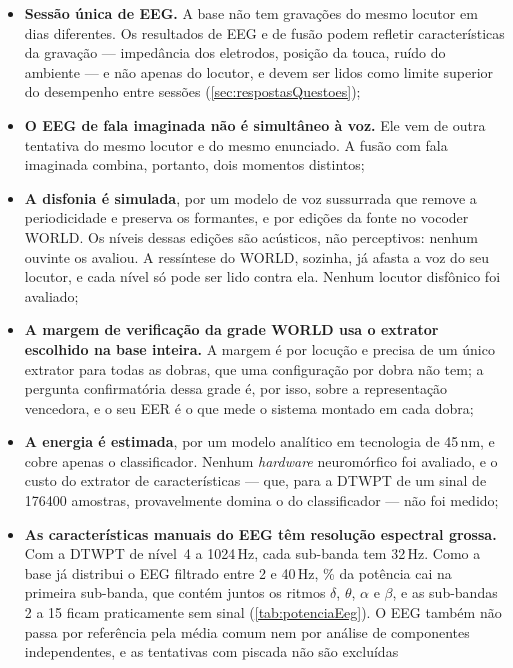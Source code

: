 		\begin{itemize}
			\item \textbf{Sessão única de \ac{EEG}.} A base não tem gravações do
			mesmo locutor em dias diferentes. Os resultados de \ac{EEG} e de fusão
			podem refletir características da gravação --- impedância dos
			eletrodos, posição da touca, ruído do ambiente --- e não apenas do
			locutor, e devem ser lidos como limite superior do desempenho entre
			sessões (\autoref{sec:respostasQuestoes});
			\item \textbf{O \ac{EEG} de fala imaginada não é simultâneo à voz.} Ele
			vem de outra tentativa do mesmo locutor e do mesmo enunciado. A fusão
			com fala imaginada combina, portanto, dois momentos distintos;
			\item \textbf{A disfonia é simulada}, por um modelo de voz sussurrada
			que remove a periodicidade e preserva os formantes, e por edições da
			fonte no vocoder WORLD. Os níveis dessas edições são acústicos, não
			perceptivos: nenhum ouvinte os avaliou. A ressíntese do WORLD, sozinha,
			já afasta a voz do seu locutor, e cada nível só pode ser lido contra
			ela. Nenhum locutor disfônico foi avaliado;
			\item \textbf{A margem de verificação da grade WORLD usa o extrator
			escolhido na base inteira.} A margem é por locução e precisa de um
			único extrator para todas as dobras, que uma configuração por dobra não
			tem; a pergunta confirmatória dessa grade é, por isso, sobre a
			representação vencedora, e o seu \ac{EER} é o que mede o sistema
			montado em cada dobra;
			\item \textbf{A energia é estimada}, por um modelo analítico em
			tecnologia de 45\,nm, e cobre apenas o classificador. Nenhum
			\textit{hardware} neuromórfico foi avaliado, e o custo do extrator de
			características --- que, para a \ac{DTWPT} de um sinal de 176400
			amostras, provavelmente domina o do classificador --- não foi medido;
			\item \textbf{As características manuais do \ac{EEG} têm resolução
			espectral grossa.} Com a \ac{DTWPT} de nível~4 a 1024\,Hz, cada
			sub-banda tem 32\,Hz. Como a base já distribui o \ac{EEG} filtrado
			entre 2 e 40\,Hz, \% da potência cai na primeira sub-banda, que
			contém juntos os ritmos $\delta$, $\theta$, $\alpha$ e $\beta$, e as
			sub-bandas 2 a 15 ficam praticamente sem sinal
			(\autoref{tab:potenciaEeg}). O \ac{EEG} também não passa por
			referência pela média comum nem por análise de componentes
			independentes, e as tentativas com piscada não são excluídas

\end{itemize}

